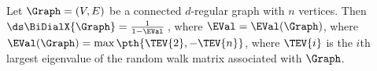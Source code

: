 \begin{lemma}
    Let $\Graph=(V,E)$ be a connected $d$-regular graph with $n$
    vertices. Then $\ds \BiDialX{\Graph} = \frac{1}{1-\EVal}\,$, where
    $\EVal = \EVal(\Graph)$, where $\EVal(\Graph) = \max\pth{\TEV{2},
       -\TEV{n} }$, where $\TEV{i}$ is the $i$th largest eigenvalue of
    the random walk matrix associated with $\Graph$.

\end{lemma}
